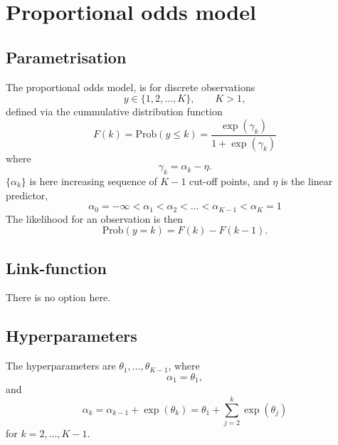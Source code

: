 \documentclass[a4paper,11pt]{article}
\begin{document}
\section*{Proportional odds model}

\subsection*{Parametrisation}

The proportional odds model, is for discrete observations
\begin{displaymath}
    y \in \{ 1, 2, \ldots, K\}, \qquad K>1,
\end{displaymath}
defined via the cummulative distribution function
\begin{displaymath}
    F(k) = \text{Prob}(y \le k)  = \frac{\exp(\gamma_k)}{1 + \exp(\gamma_k)}
\end{displaymath}
where
\begin{displaymath}
    \gamma_k = \alpha_k - \eta.
\end{displaymath}
$\{\alpha_k\}$ is here increasing sequence of $K-1$ cut-off points, and $\eta$ is the
linear predictor,
\begin{displaymath}
    \alpha_{0} = -\infty < \alpha_1 < \alpha_2 < \ldots < \alpha_{K-1}
    < \alpha_K=1
\end{displaymath}
The likelihood for an observation is then
\begin{displaymath}
    \text{Prob}(y = k) = F(k) - F(k-1).
\end{displaymath}

\subsection*{Link-function}

There is no option here.

\subsection*{Hyperparameters}

The hyperparameters are $\theta_1, \ldots, \theta_{K-1}$, where
\begin{displaymath}
    \alpha_1 = \theta_1,
\end{displaymath}
and 
\begin{displaymath}
    \alpha_{k} = \alpha_{k-1} + \exp(\theta_{k}) = \theta_1 +
    \sum_{j=2}^{k} \exp(\theta_j)
\end{displaymath}
for $k=2, \ldots, K-1$.
\end{document}
